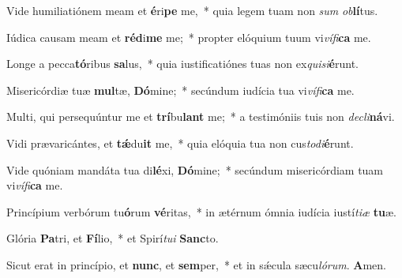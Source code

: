 \item Vide humiliatiónem meam et \textbf{é}ri\textbf{pe} me,~* quia legem tuam non \textit{sum} \textit{ob}\textbf{lí}tus.

\item Iúdica causam meam et \textbf{réd}i\textbf{me} me;~* propter elóquium tuum vi\textit{vífi}\textbf{ca} me.

\item Longe a pecca\textbf{tó}ribus \textbf{sa}lus,~* quia iustificatiónes tuas non ex\textit{quisi}\textbf{é}runt.

\item Misericórdiæ tuæ \textbf{mul}tæ, \textbf{Dó}mine;~* secúndum iudícia tua vi\textit{vífi}\textbf{ca} me.

\item Multi, qui persequúntur me et \textbf{trí}bu\textbf{lant} me;~* a testimóniis tuis non \textit{decli}\textbf{ná}vi.

\item Vidi prævaricántes, et \textbf{tǽ}du\textbf{it} me,~* quia elóquia tua non cus\textit{todi}\textbf{é}runt.

\item Vide quóniam mandáta tua di\textbf{lé}xi, \textbf{Dó}mine;~* secúndum misericórdiam tuam vi\textit{vífi}\textbf{ca} me.

\item Princípium verbórum tu\textbf{ó}rum \textbf{vé}ritas,~* in ætérnum ómnia iudícia iustí\textit{tiæ} \textbf{tu}æ.

\item Glória \textbf{Pa}tri, et \textbf{Fí}lio,~* et Spirí\textit{tui} \textbf{Sanc}to.

\item Sicut erat in princípio, et \textbf{nunc}, et \textbf{sem}per,~* et in sǽcula sæcu\textit{lórum}. \textbf{A}men.